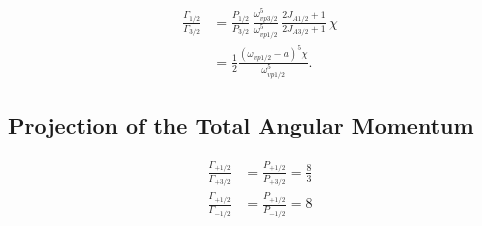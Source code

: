 \begin{align}
  \frac{\Gamma_{1/2}}{\Gamma_{3/2}}
  &= \frac{P_{1/2}}{P_{3/2}}
     \,\frac{\omega_{vp3/2}^5}{\omega_{vp1/2}^5}
     \,\frac{2J_{A1/2}+1}{2J_{A3/2}+1} \,\chi\\
  &= \frac 12 \frac{(\omega_{vp1/2} -a)^5 \chi}{\omega_{vp1/2}^5} .
\end{align}


\subsection{Projection of the Total Angular Momentum}

\begin{align}
  \frac{\Gamma_{+1/2}}{\Gamma_{+3/2}} &= \frac{P_{+1/2}}{P_{+3/2}} = \frac 83  \\
  \frac{\Gamma_{+1/2}}{\Gamma_{-1/2}} &= \frac{P_{+1/2}}{P_{-1/2}} = 8 
\end{align}

%
%
%
%
%
%
%
%
%

